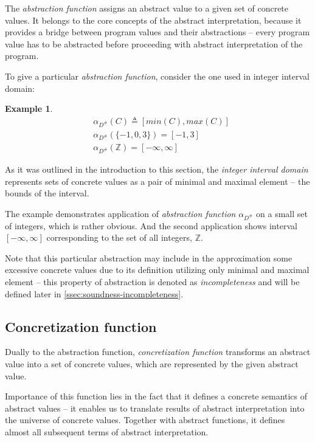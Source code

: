 \documentclass[12pt,oneside]{fithesis2}
\theoremstyle{definition}
\newtheorem{exmp}{Example}[section]
\begin{document}
The \textit{abstraction function} assigns an abstract value to a given set of concrete values. It belongs to the core concepts of the abstract interpretation, because it provides a bridge between program values and their abstractions -- every program value has to be abstracted before proceeding with abstract interpretation of the program.

To give a particular \textit{abstraction function}, consider the one used in integer interval domain:

\begin{exmp}
  \begin{align*}
    &\alpha_{D^\#}(C) \triangleq [min(C), max(C)]\\
    &\alpha_{D^\#}(\{-1, 0, 3\}) = [-1, 3]\\
    &\alpha_{D^\#}(\mathbb Z) = [-\infty, \infty]
  \end{align*}
\end{exmp}

As it was outlined in the introduction to this section, the \textit{integer interval domain} represents sets of concrete values as a pair of minimal and maximal element -- the bounds of the interval.

The example demonstrates application of \textit{abstraction function} $\alpha_{D^\#}$ on a small set of integers, which is rather obvious. And the second application shows interval $[-\infty, \infty]$ corresponding to the set of all integers, $\mathbb Z$.

Note that this particular abstraction may include in the approximation some excessive concrete values due to its definition utilizing only minimal and maximal element -- this property of abstraction is denoted as \textit{incompleteness} and will be defined later in \ref{ssec:soundness-incompleteness}.

\subsection{Concretization function}
Dually to the abstraction function, \textit{concretization function} transforms an abstract value into a set of concrete values, which are represented by the given abstract value.

Importance of this function lies in the fact that it defines a concrete semantics of abstract values -- it enables us to translate results of abstract interpretation into the universe of concrete values. Together with abstract functions, it defines almost all subsequent terms of abstract interpretation.
\end{document}
